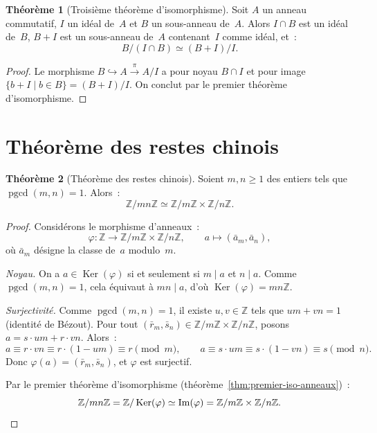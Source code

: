 \documentclass[12pt,a4paper,openany]{book}
\theoremstyle{definition}
\newtheorem{theoreme}{Théorème}[chapter]
\newcommand{\Z}{\mathbb{Z}}
\DeclareMathOperator{\Ker}{Ker}
\renewcommand{\Im}{\operatorname{Im}}
\DeclareMathOperator{\pgcd}{pgcd}
\begin{document}
\begin{theoreme}[Troisième théorème d'isomorphisme]%
\label{thm:troisieme-iso-anneaux}
Soit $A$ un anneau commutatif, $I$ un idéal de~$A$ et $B$ un
sous-anneau de~$A$. Alors $I \cap B$ est un idéal de~$B$, $B + I$ est
un sous-anneau de~$A$ contenant~$I$ comme idéal, et~:
\[
  B / (I \cap B) \simeq (B + I) / I.
\]
\end{theoreme}

\begin{proof}
Le morphisme $B \hookrightarrow A \xrightarrow{\pi} A/I$ a pour noyau
$B \cap I$ et pour image $\{b + I \mid b \in B\} = (B + I)/I$. On
conclut par le premier théorème d'isomorphisme.
\end{proof}

\section{Théorème des restes chinois}\label{sec:CRT}

\begin{theoreme}[Théorème des restes chinois]\label{thm:CRT}
Soient $m, n \geqslant 1$ des entiers tels que $\pgcd(m,n) = 1$. Alors~:
\[
  \Z/mn\Z \simeq \Z/m\Z \times \Z/n\Z.
\]
\end{theoreme}

\begin{proof}
Considérons le morphisme d'anneaux~:
\[
  \varphi \colon \Z \longrightarrow \Z/m\Z \times \Z/n\Z, \qquad
  a \longmapsto (\bar{a}_m, \bar{a}_n),
\]
où $\bar{a}_m$ désigne la classe de~$a$ modulo~$m$.

\emph{Noyau.} On a $a \in \Ker(\varphi)$ si et seulement si $m \mid a$
et $n \mid a$. Comme $\pgcd(m,n) = 1$, cela équivaut à $mn \mid a$,
d'où $\Ker(\varphi) = mn\Z$.

\emph{Surjectivité.} Comme $\pgcd(m,n) = 1$, il existe $u, v \in \Z$
tels que $um + vn = 1$ (identité de Bézout).
Pour tout $(\bar{r}_m, \bar{s}_n) \in \Z/m\Z \times \Z/n\Z$, posons
$a = s \cdot um + r \cdot vn$. Alors~:
\[
  a \equiv r \cdot vn \equiv r \cdot (1 - um) \equiv r \pmod{m},
  \qquad
  a \equiv s \cdot um \equiv s \cdot (1 - vn) \equiv s \pmod{n}.
\]
Donc $\varphi(a) = (\bar{r}_m, \bar{s}_n)$, et $\varphi$ est surjectif.

Par le premier théorème d'isomorphisme
(théorème~\ref{thm:premier-iso-anneaux})~:
\[
  \Z/mn\Z = \Z/\Ker(\varphi) \simeq \Im(\varphi)
  = \Z/m\Z \times \Z/n\Z. \qedhere
\]
\end{proof}
\end{document}

